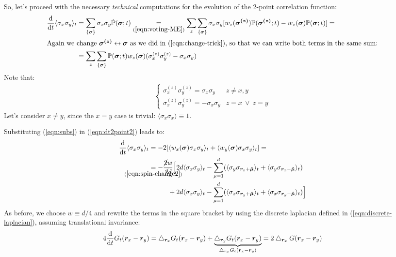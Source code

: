 \documentclass[../../main.tex]{subfiles}
\begin{document}
So, let's proceed with the necessary \textit{technical}  computations for the evolution of the $2$-point correlation function:
\begin{align}\nonumber
    \dv{t} \langle \sigma_x \sigma_y \rangle_t &= \sum_{\{\bm{\sigma}\}} \sigma_x \sigma_y \dot{\mathbb{P}}(\bm{\sigma};t) \underset{(\ref{eqn:voting-ME})}{=} \sum_z \sum_{\{\bm{\sigma}\}} \sigma_x \sigma_y [ w_z(\bm{\sigma^{(z)}}) \mathbb{P}(\bm{\sigma^{(z)}};t)- w_z(\bm{\sigma}) \mathbb{P}(\bm{\sigma};t)] =\\
    \intertext{Again we change $\bm{\sigma^{(z)}} \leftrightarrow \bm{\sigma}$ as we did in (\ref{eqn:change-trick}), so that we can write both terms in the same sum:}
    &= \sum_z \sum_{\{\bm{\sigma}\}} \mathbb{P}(\bm{\sigma};t) w_z(\bm{\sigma}) (\sigma_x^{(z)} \sigma_y^{(z)} - \sigma_x \sigma_y) \label{eqn:dt2point2}
\end{align}
Note that:
\begin{align}\label{eqn:subs}
    \begin{cases}
        \sigma_x^{(z)} \sigma_y^{(z)} = \sigma_x \sigma_y & z \neq x,y\\
        \sigma_x^{(z)} \sigma_y^{(z)} = -\sigma_x \sigma_y & z = x \> \lor \> z = y
    \end{cases} 
\end{align}
Let's consider $x \neq y$, since the $x = y$ case is trivial: $\langle \sigma_x \sigma_x \rangle \equiv 1$.

Substituting (\ref{eqn:subs}) in (\ref{eqn:dt2point2}) leads to:
\begin{align*}
    \dv{t} \langle \sigma_x \sigma_y \rangle_t &= - 2[ \langle w_x(\bm{\sigma}) \sigma_x \sigma_y \rangle_t + \langle w_y(\bm{\sigma}) \sigma_x \sigma_y \rangle_t] = \\
    &\underset{\mathclap{(\ref{eqn:spin-change2})}}{=} - \frac{\cancel{2} w}{\cancel{2} d} \Big[2d \langle \sigma_x \sigma_y  \rangle_t - \sum_{\mu=1}^d ( \langle \sigma_y \sigma_{\bm{r}_x + \bm{\hat{\mu}}} \rangle_t + \langle \sigma_y \sigma_{\bm{r}_x - \bm{\hat{\mu}}} \rangle_t) \\
    &\qquad \>\>\>\, +2d \langle \sigma_x \sigma_y \rangle_t - \sum_{\mu=1}^d (\langle \sigma_x \sigma_{\bm{r}_y + \bm{\hat{\mu}}} \rangle_t + \langle \sigma_{x} \sigma_{\bm{r}_y - \bm{\hat{\mu}}} \rangle_t) \Big]    
\end{align*}
As before, we choose $w \equiv d/4$ and rewrite the terms in the square bracket by using the discrete laplacian defined in (\ref{eqn:discrete-laplacian}), assuming translational invariance:
\begin{align*}
    4 \dv{t} G_t(\bm{r}_x - \bm{r}_y) = \bigtriangleup_{\bm{r}_x} G_t(\bm{r}_x - \bm{r}_y) + \underbrace{\bigtriangleup_{\bm{r}_y} G_t(\bm{r}_x - \bm{r}_y)}_{\bigtriangleup_{\bm{r}_x} G_t(\bm{r}_x - \bm{r}_y)} = 2 \bigtriangleup_{\bm{r}_x} G(\bm{r}_x - \bm{r}_y)
\end{align*} 
\end{document}
